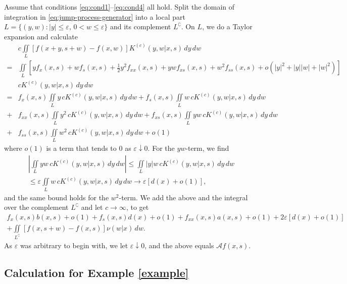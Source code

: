 \documentclass[a4paper,12pt]{elsarticle}
\numberwithin{equation}{section}
\theoremstyle{plain}
\theoremstyle{definition}
\theoremstyle{remark}
\numberwithin{equation}{section}
\newcommand{\1}{\mathbf 1}
\begin{document}
Assume that conditions \eqref{eq:cond1}--\eqref{eq:cond4} all hold. 
Split the domain of integration in \eqref{eq:jump-process-generator} into a local part $L = \{(y,w): |y| \le \varepsilon, \, 0 < w \le \varepsilon\}$ and its complement $L^\complement$. On $L$, we do a Taylor expansion and calculate
\begin{align*}
&c \iint\limits_L [f(x+y, s+w) - f(x,w)] K^{(c)}(y,w|x,s)\,dy\,dw
\\
= &\iint\limits_L \left[y f_x(x,s)
+ w f_s(x,s)
+ \frac{1}{2} y^2 f_{xx}(x,s) 
+ yw f_{xs}(x,s) 
+ w^2 f_{ss}(x,s)
+ o(|y|^2 + |y||w| + |w|^2)\right]
\\
& c K^{(c)}(y,w | x,s) \,dy\,dw
\\
= &f_x(x,s) \iint\limits_L y \,cK^{(c)}(y,w|x,s)\,dy\,dw
+ f_s(x,s) \iint\limits_L w \,cK^{(c)}(y,w|x,s)\,dy\,dw
\\
+ &f_{xx}(x,s) \iint\limits_L y^2 \,cK^{(c)}(y,w|x,s)\,dy\,dw
+ f_{xs}(x,s) \iint\limits_L yw \,cK^{(c)}(y,w|x,s)\,dy\,dw
\\
+ &f_{ss}(x,s) \iint\limits_L w^2 \,cK^{(c)}(y,w|x,s)\,dy\,dw
+ o(1)
\end{align*}
where $o(1)$ is a term that tends to $0$ as $\varepsilon \downarrow 0$. 
For the $yw$-term, we find 
\begin{align*}
\left|\iint\limits_L yw \,cK^{(c)}(y,w|x,s)\,dy\,dw \right|
\le \iint\limits_L |y|w \,cK^{(c)}(y,w|x,s)\,dy\,dw
\\
\le \varepsilon \iint\limits_L w \,cK^{(c)}(y,w|x,s)\,dy\,dw
\to \varepsilon [d(x) + o(1)],
\end{align*}
and the same bound holds for the $w^2$-term. 
We add the above and the integral over the complement $L^\complement$ and let $c \to \infty$, to get
\begin{align*}
f_x(x,s) b(x,s) + o(1) + f_s(x,s) d(x) + o(1) + f_{xx}(x,s) a(x,s) + o(1) 
+ 2\varepsilon [d(x) + o(1)]
\\
+ \iint\limits_{L^\complement} [f(x, s+w) - f(x,s)] \nu(w|x)\,dw.
\end{align*}
As $\varepsilon$ was arbitrary to begin with, we let $\varepsilon \downarrow 0$, 
and the above equals $\mathcal A f(x,s)$. 


\subsection{Calculation for Example \ref{example}}
\label{subsec:calc-for-example}
\end{document}
